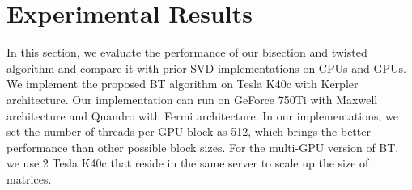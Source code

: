 \vspace{-0.1in}
\section{Experimental Results} \label{sec:results}
\vspace{-0.1in}
In this section, we evaluate the performance of our bisection and twisted algorithm and compare it with prior SVD implementations on CPUs and GPUs.
We implement the proposed BT algorithm on Tesla K40c with Kerpler architecture. 
Our implementation can run on GeForce 750Ti with Maxwell architecture and Quandro with Fermi architecture. 
In our implementations, we set the number of threads per GPU block as 512, which brings the better performance than other possible block sizes.
For the multi-GPU version of BT, we use 2 Tesla K40c that reside in the same server to scale up the size of matrices. 

